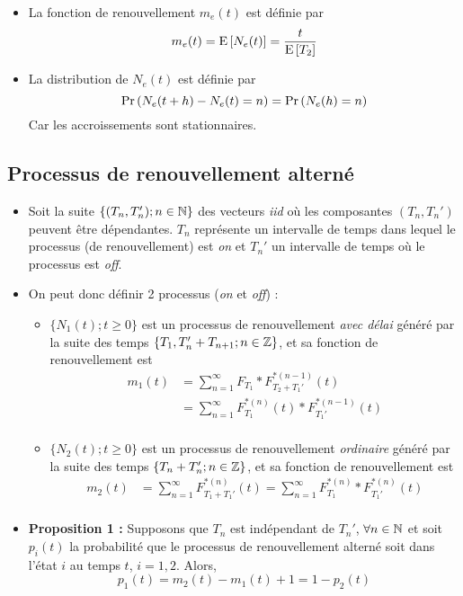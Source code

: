 \documentclass[10pt, french, landscape]{article}
\begin{document}
\begin{multicols*}{2}
\begin{itemize}
\item La fonction de renouvellement $m_e(t)$ est définie par
\[m_e(t) = \mathrm{E} \left[ N_e(t) \right] = \frac{t}{\mathrm{E} \left[ T_2 \right]} \]

\item La distribution de $N_e(t)$ est définie par
\[\Pr \left( N_e(t+h) - N_e(t) = n \right) = \Pr \left( N_e(h) = n \right)\]
Car les accroissements sont stationnaires.
\end{itemize}

\subsection*{Processus de renouvellement alterné}
\begin{itemize}
\item Soit la suite $\{ (T_n, T_n') ; n \in \mathbb{N} \}$ des vecteurs \emph{iid} où les composantes $(T_n, T_n')$ peuvent être dépendantes. $T_n$ représente un intervalle de temps dans lequel le processus (de renouvellement) est \emph{on} et $T_n'$ un intervalle de temps où le processus est \emph{off}.

\item On peut donc définir 2 processus  (\emph{on} et \emph{off}) :  
\begin{itemize}
	\item $\{ N_1(t) ; t \geq 0 \}$ est un processus de renouvellement \emph{avec délai} généré par la suite des temps $\{ T_1, T_n' + T_{n+1} ; n \in \mathbb{Z} \}$, et sa fonction de renouvellement est
	\begin{align*}
	m_1(t) & = \sum_{n=1}^{\infty} F_{T_1} \ast F_{T_2 + T_1'}
	^{\ast(n-1)}(t) \\
	& = \sum_{n=1}^{\infty} F_{T_1}^{\ast(n)}(t) \ast F_{T_1'}^{\ast(n-1)}(t) \\
	\end{align*}
	\item 	$\{ N_2(t) ; t \geq 0 \}$ est un processus de renouvellement \emph{ordinaire} généré par la suite des temps $\{ T_n + T_n'; n \in \mathbb{Z} \}$, et sa fonction de renouvellement est
	\begin{align*}
	m_2(t) &= \sum_{n=1}^{\infty} F_{T_1 +  T_1'}^{\ast(n)}(t) = \sum_{n=1}^{\infty} F_{T_1}^{\ast(n)} \ast F_{T_1'}^{\ast(n)}(t) \\
	\end{align*}
\end{itemize}
\item \textbf{Proposition 1 : } Supposons que $T_n$ est indépendant de $T_n'$, $\forall n \in \mathbb{N}$ et soit $p_i(t)$ la probabilité que le processus de renouvellement alterné soit dans l'état $i$ au temps $t$, $i=1,2$. Alors,
\[p_1(t) = m_2(t) - m_1(t) + 1 = 1 - p_2(t) \]


\end{itemize}
\end{multicols*}
\end{document}
